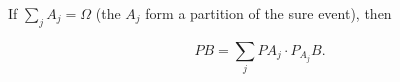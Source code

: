 If $\sum_j A_j = \Omega$ (the $A_j$ form a partition of the sure event), then

$$PB = \sum_j PA_j \cdot P_{A_j} B.$$
